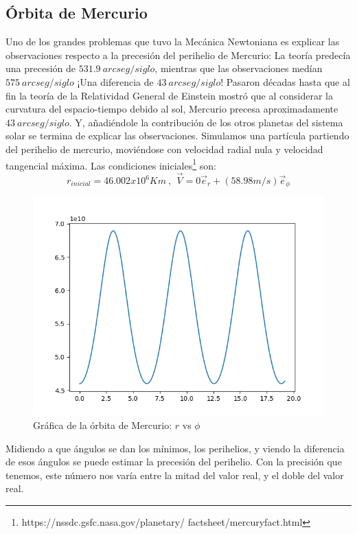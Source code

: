 \subsection*{\textbf{Órbita de Mercurio}}
Uno de los grandes problemas que tuvo la Mecánica Newtoniana es explicar las observaciones respecto a la precesión del perihelio de Mercurio: La teoría predecía una precesión de $531.9\ arc seg/siglo$, mientras que las observaciones medían $575\ arc seg/siglo$ ¡Una diferencia de $43\ arc seg/siglo$! Pasaron décadas hasta que al fin la teoría de la Relatividad General de Einstein mostró que al considerar la curvatura del espacio-tiempo debido al sol, Mercurio precesa aproximadamente $43\ arc seg/siglo$. Y, añadiéndole la contribución de los otros planetas del sistema solar se termina de explicar las observaciones. Simulamos una partícula partiendo del perihelio de mercurio, moviéndose con velocidad radial nula y velocidad tangencial máxima. Las condiciones iniciales\footnote{https://nssdc.gsfc.nasa.gov/planetary/
factsheet/mercuryfact.html} son:
\begin{equation}
    r_{inicial}=46.002x10^6 Km\ \text{, }\ \Vec{V}= 0\Vec{e}_r + (58.98 m/s)\Vec{e}_{\phi}
\end{equation}

\begin{figure}[h!]
    \centering
    \includegraphics[width=.8\textwidth]{Im/rvsphi_mercurio.png}
    \caption{Gráfica de la órbita de Mercurio: $r$ vs $\phi$}
\end{figure}

Midiendo a que ángulos se dan los mínimos, los perihelios, y viendo la diferencia de esos ángulos se puede estimar la precesión del perihelio. Con la precisión que tenemos, este número nos varía entre la mitad del valor real, y el doble del valor real. 

